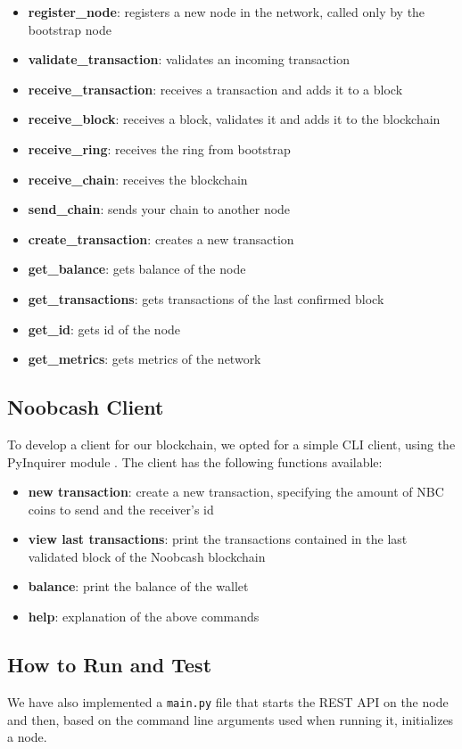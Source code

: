 \documentclass[conference]{IEEEtran}
\begin{document}
\begin{itemize}
\item \textbf{register\_node}: registers a new node in the network, called only by the bootstrap node
\item \textbf{validate\_transaction}: validates an incoming transaction
\item \textbf{receive\_transaction}: receives a transaction and adds it to a block
\item \textbf{receive\_block}: receives a block, validates it and adds it to the blockchain
\item \textbf{receive\_ring}: receives the ring from bootstrap
\item \textbf{receive\_chain}: receives the blockchain
\item \textbf{send\_chain}: sends your chain to another node
\item \textbf{create\_transaction}: creates a new transaction
\item \textbf{get\_balance}: gets balance of the node
\item \textbf{get\_transactions}: gets transactions of the last confirmed block
\item \textbf{get\_id}: gets id of the node
\item \textbf{get\_metrics}: gets metrics of the network
\end{itemize}

\subsection{Noobcash Client}
To develop a client for our blockchain, we opted for a simple CLI client, using the PyInquirer module \cite{b4}.
The client has the following functions available:

\begin{itemize}
\item \textbf{new transaction}: create a new transaction, specifying the amount of NBC coins to send and the receiver's id
\item \textbf{view last transactions}: print the transactions contained in the last validated block of the Noobcash blockchain
\item \textbf{balance}: print the balance of the wallet
\item \textbf{help}: explanation of the above commands
\end{itemize}

\subsection{How to Run and Test}
We have also implemented a \verb|main.py| file that starts the REST API on the node and then, based on the command line arguments used when running it, initializes a node.
\end{document}
